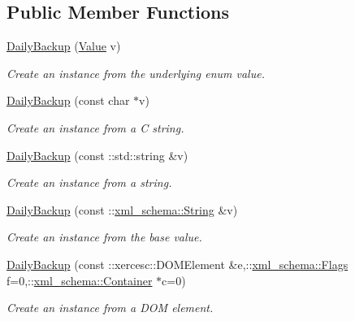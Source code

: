 \subsection*{Public Member Functions}
\begin{DoxyCompactItemize}
\item 
\hyperlink{classopenstack_1_1xml_1_1DailyBackup_abad5eebe977f96f59b19b4f629322b6d}{DailyBackup} (\hyperlink{classopenstack_1_1xml_1_1DailyBackup_a61da52f27012e476ed49b709f9408add}{Value} v)
\begin{DoxyCompactList}\small\item\em Create an instance from the underlying enum value. \item\end{DoxyCompactList}\item 
\hyperlink{classopenstack_1_1xml_1_1DailyBackup_a33d70eeba4ffec091ae6b7f09ff6f9e2}{DailyBackup} (const char $\ast$v)
\begin{DoxyCompactList}\small\item\em Create an instance from a C string. \item\end{DoxyCompactList}\item 
\hyperlink{classopenstack_1_1xml_1_1DailyBackup_ad13f8500c6c7d096654f2c063e26790f}{DailyBackup} (const ::std::string \&v)
\begin{DoxyCompactList}\small\item\em Create an instance from a string. \item\end{DoxyCompactList}\item 
\hyperlink{classopenstack_1_1xml_1_1DailyBackup_a7b462d433b4ed6e047c97946be52f8ec}{DailyBackup} (const ::\hyperlink{namespacexml__schema_af6757b5701ccc893f3b551bd70e0c94d}{xml\_\-schema::String} \&v)
\begin{DoxyCompactList}\small\item\em Create an instance from the base value. \item\end{DoxyCompactList}\item 
\hyperlink{classopenstack_1_1xml_1_1DailyBackup_a15d590813ef0ae5e434f59b89b0de58f}{DailyBackup} (const ::xercesc::DOMElement \&e,::\hyperlink{namespacexml__schema_affb4c227cbd9aa7453dd1dc5a1401943}{xml\_\-schema::Flags} f=0,::\hyperlink{namespacexml__schema_a333dea2213742aea47a37532dec4ec27}{xml\_\-schema::Container} $\ast$c=0)
\begin{DoxyCompactList}\small\item\em Create an instance from a DOM element. \item\end{DoxyCompactList}\item 

\end{DoxyCompactItemize}
